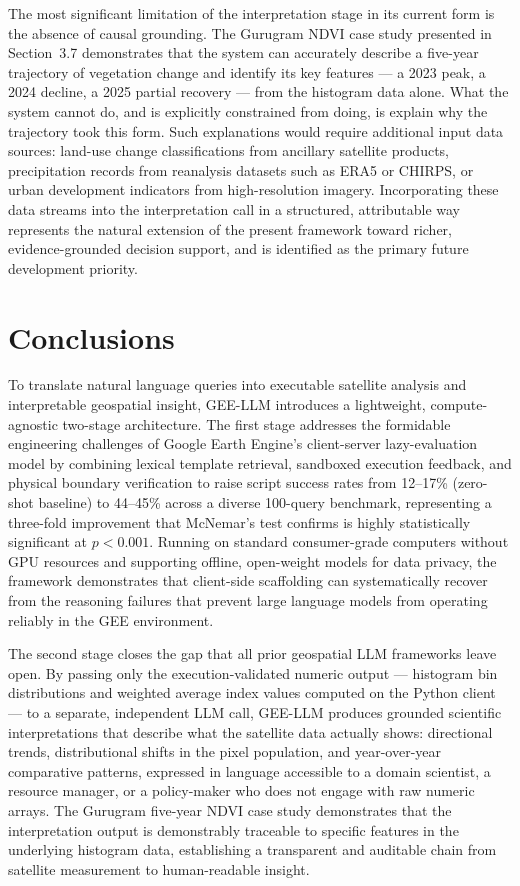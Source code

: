 \documentclass[pdflatex,sn-mathphys-ay]{sn-jnl}
\begin{document}
The most significant limitation of the interpretation stage in its current form is the absence of causal grounding. The Gurugram NDVI case study presented in Section~3.7 demonstrates that the system can accurately describe a five-year trajectory of vegetation change and identify its key features --- a 2023 peak, a 2024 decline, a 2025 partial recovery --- from the histogram data alone. What the system cannot do, and is explicitly constrained from doing, is explain why the trajectory took this form. Such explanations would require additional input data sources: land-use change classifications from ancillary satellite products, precipitation records from reanalysis datasets such as ERA5 or CHIRPS, or urban development indicators from high-resolution imagery. Incorporating these data streams into the interpretation call in a structured, attributable way represents the natural extension of the present framework toward richer, evidence-grounded decision support, and is identified as the primary future development priority.

\section{Conclusions}\label{sec:conclusion}

To translate natural language queries into executable satellite analysis and interpretable geospatial insight, GEE-LLM introduces a lightweight, compute-agnostic two-stage architecture. The first stage addresses the formidable engineering challenges of Google Earth Engine's client-server lazy-evaluation model by combining lexical template retrieval, sandboxed execution feedback, and physical boundary verification to raise script success rates from 12--17\% (zero-shot baseline) to 44--45\% across a diverse 100-query benchmark, representing a three-fold improvement that McNemar's test confirms is highly statistically significant at $p < 0.001$. Running on standard consumer-grade computers without GPU resources and supporting offline, open-weight models for data privacy, the framework demonstrates that client-side scaffolding can systematically recover from the reasoning failures that prevent large language models from operating reliably in the GEE environment.

The second stage closes the gap that all prior geospatial LLM frameworks leave open. By passing only the execution-validated numeric output --- histogram bin distributions and weighted average index values computed on the Python client --- to a separate, independent LLM call, GEE-LLM produces grounded scientific interpretations that describe what the satellite data actually shows: directional trends, distributional shifts in the pixel population, and year-over-year comparative patterns, expressed in language accessible to a domain scientist, a resource manager, or a policy-maker who does not engage with raw numeric arrays. The Gurugram five-year NDVI case study demonstrates that the interpretation output is demonstrably traceable to specific features in the underlying histogram data, establishing a transparent and auditable chain from satellite measurement to human-readable insight.
\end{document}
